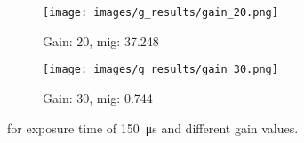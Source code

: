 \begin{figure}[h]
    \begin{subfigure}[b]{0.4\textwidth}
        \centering
        \texttt{[image: images/g\_results/gain\_20.png]}
        \caption{Gain: 20, \gls{mig}: 37.248}
        \label{subfig:underexposed.png}
    \end{subfigure}
    \hspace{1cm}
    \begin{subfigure}[b]{0.4\textwidth}
        \centering
        \texttt{[image: images/g\_results/gain\_30.png]}
        \caption{Gain: 30, \gls{mig}: 0.744}
        \label{subfig:underexposed.png}
    \end{subfigure}
    \caption{ for exposure time of \SI{150}{\micro\second} and different gain values.}
    \label{fig:example_images_gain}
\end{figure}

